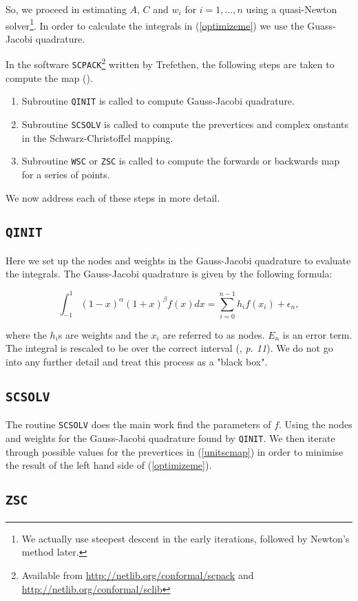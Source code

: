 \documentclass[a4paper,10pt]{amsart}
\newcommand{\sch}{Schwarz-Christoffel }
\begin{document}
So, we proceed in estimating $A$, $C$ and $w_i$ for $i=1,\dots,n$ using a quasi-Newton solver\footnote{We actually use steepest descent in the early iterations, followed by Newton's method later.}. In order to calculate the integrals in (\ref{optimizeme}) we use the Guass-Jacobi quadrature.

In the software \texttt{SCPACK}\footnote{Available from \url{http://netlib.org/conformal/scpack} and \url{http://netlib.org/conformal/sclib}} written by Trefethen, the following steps are taken to compute the map (\cite{scdoc}).

\begin{enumerate}
\item Subroutine \texttt{QINIT} is called to compute Gauss-Jacobi quadrature.
\item Subroutine \texttt{SCSOLV} is called to compute the prevertices and complex onstants in the \sch mapping.
\item Subroutine \texttt{WSC} or \texttt{ZSC} is called to compute the forwards or backwards map for a series of points.
\end{enumerate}

We now address each of these steps in more detail.

\subsection{\texttt{QINIT}}

Here we set up the nodes and weights in the Gauss-Jacobi quadrature to evaluate the integrals. The Gauss-Jacobi quadrature is given by the following formula:

\begin{equation}
\int_{-1}^{1} (1-x)^\alpha (1+x)^\beta f(x) dx = \sum_{i=0}^{n-1}h_if(x_i) + \epsilon_n,
\end{equation}

where the $h_i$s are weights and the $x_i$ are referred to as nodes. $E_n$ is an error term. The integral is rescaled to be over the correct interval (\cite{trefethen}, \emph{p. 11}). We do not go into any further detail and treat this process as a "black box".

\subsection{\texttt{SCSOLV}}

The routine \texttt{SCSOLV} does the main work find the parameters of $f$. Using the nodes and weights for the Gauss-Jacobi quadrature found by \texttt{QINIT}. We then iterate through possible values for the prevertices in (\ref{unitscmap}) in order to minimise the result of the left hand side of (\ref{optimizeme}).

\subsection{\texttt{ZSC}}









\end{document}
